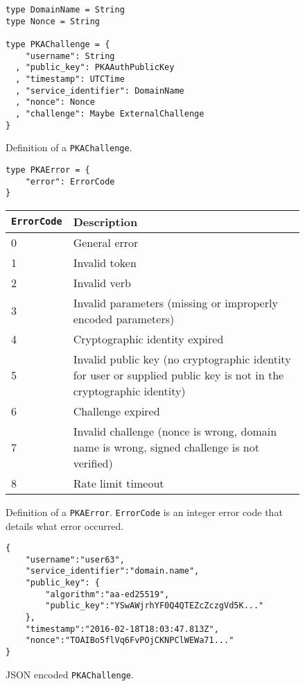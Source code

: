 \documentclass{article}
\newcommand{\todo}[1]{\textcolor{red}{#1}}
\begin{document}
\begin{figure}
\begin{lstlisting}
type DomainName = String
type Nonce = String

type PKAChallenge = {
    "username": String
  , "public_key": PKAAuthPublicKey
  , "timestamp": UTCTime
  , "service_identifier": DomainName
  , "nonce": Nonce
  , "challenge": Maybe ExternalChallenge
}
\end{lstlisting}
\caption{Definition of a \texttt{PKAChallenge}.}
\label{code:pkachallenge}
\end{figure}

\begin{figure}
\begin{lstlisting}
type PKAError = {
    "error": ErrorCode
}
\end{lstlisting}
\begin{tabular}{| l | p{14cm} |}
\hline
\texttt{ErrorCode} & Description \\
\hline
0 & General error \\
1 & Invalid token \\
2 & Invalid verb \\
3 & Invalid parameters (missing or improperly encoded parameters) \\
4 & Cryptographic identity expired \\
5 & Invalid public key (no cryptographic identity for user or supplied public key is not in the cryptographic identity) \\
6 & Challenge expired \\
7 & Invalid challenge (nonce is wrong, domain name is wrong, signed challenge is not verified) \\
8 & Rate limit timeout \\
\hline
\end{tabular}
\caption{Definition of a \texttt{PKAError}. \texttt{ErrorCode} is an integer error code that details what error occurred.}
\label{code:pkaerror}
\end{figure}





\begin{figure}
\begin{lstlisting}
{
    "username":"user63",
    "service_identifier":"domain.name",
    "public_key": {
        "algorithm":"aa-ed25519",
        "public_key":"YSwAWjrhYF0Q4QTEZcZczgVd5K..."
    },
    "timestamp":"2016-02-18T18:03:47.813Z",
    "nonce":"TOAIBo5flVq6FvPOjCKNPClWEWa71..."
}
\end{lstlisting}
\caption{JSON encoded \texttt{PKAChallenge}.}
\label{code:pkachallengejson}
\end{figure}
\end{document}
